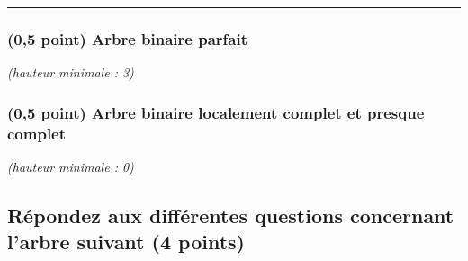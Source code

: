 \documentclass[11pt,a4paper]{article}
\begin{document}
\vspace*{-0.5cm}
\rule{1.0\linewidth}{0.75pt}

\begin{table}[ht!]
  \centering
  \begin{minipage}{0.50\textwidth}
    \centering

\subsubsection{(0,5 point) Arbre binaire parfait}

\textit{(hauteur minimale : 3)}

  \end{minipage}
  \hfillx
  \begin{minipage}{0.50\textwidth}
    \centering

\subsubsection{(0,5 point) Arbre binaire localement complet et presque complet}

\textit{(hauteur minimale : 0)}

  \end{minipage}
\end{table}

\clearpage


\subsection{Répondez aux différentes questions concernant l'arbre suivant (4 points) }

\bigskip
\end{document}
